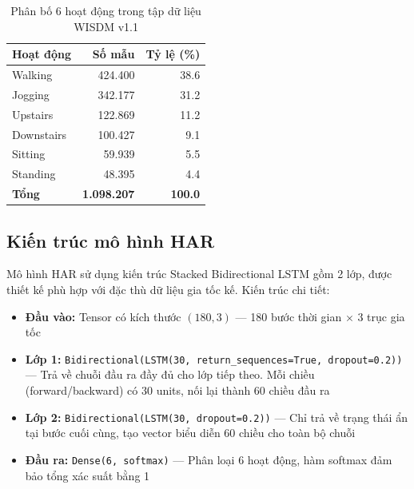 \begin{table}[H]
\centering
\caption{Phân bố 6 hoạt động trong tập dữ liệu WISDM v1.1}
\label{tab:wisdm_distribution}
\begin{tabular}{|l|r|r|}
\hline
\textbf{Hoạt động} & \textbf{Số mẫu} & \textbf{Tỷ lệ (\%)} \\
\hline
Walking       & 424.400 & 38.6 \\
Jogging       & 342.177 & 31.2 \\
Upstairs      & 122.869 & 11.2 \\
Downstairs    & 100.427 & 9.1 \\
Sitting       & 59.939  & 5.5 \\
Standing      & 48.395  & 4.4 \\
\hline
\textbf{Tổng} & \textbf{1.098.207} & \textbf{100.0} \\
\hline
\end{tabular}
\end{table}

\subsection{Kiến trúc mô hình HAR}
\label{subsec:har_architecture}

Mô hình HAR sử dụng kiến trúc Stacked Bidirectional LSTM gồm 2 lớp, được thiết kế phù hợp với đặc thù dữ liệu gia tốc kế. Kiến trúc chi tiết:

\begin{itemize}
    \item \textbf{Đầu vào:} Tensor có kích thước $(180, 3)$ — 180 bước thời gian $\times$ 3 trục gia tốc
    \item \textbf{Lớp 1:} \texttt{Bidirectional(LSTM(30, return\_sequences=True, dropout=0.2))} — Trả về chuỗi đầu ra đầy đủ cho lớp tiếp theo. Mỗi chiều (forward/backward) có 30 units, nối lại thành 60 chiều đầu ra
    \item \textbf{Lớp 2:} \texttt{Bidirectional(LSTM(30, dropout=0.2))} — Chỉ trả về trạng thái ẩn tại bước cuối cùng, tạo vector biểu diễn 60 chiều cho toàn bộ chuỗi
    \item \textbf{Đầu ra:} \texttt{Dense(6, softmax)} — Phân loại 6 hoạt động, hàm softmax đảm bảo tổng xác suất bằng 1
\end{itemize}

